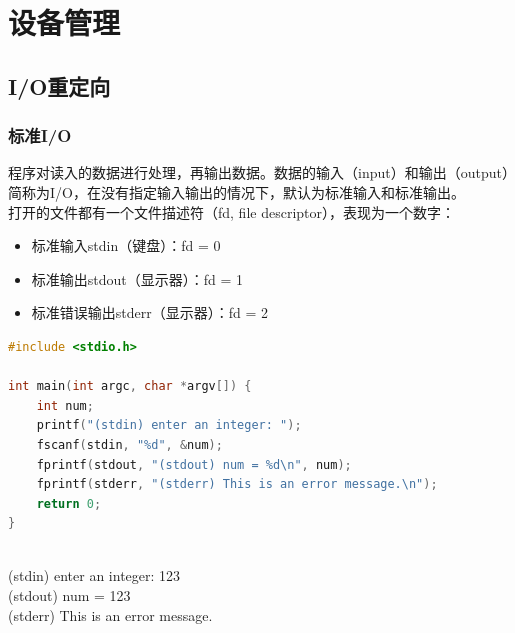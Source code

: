 \chapter{设备管理}

\section{I/O重定向}

\subsection{标准I/O}

程序对读入的数据进行处理，再输出数据。数据的输入（input）和输出（output）简称为I/O，在没有指定输入输出的情况下，默认为标准输入和标准输出。 \\

打开的文件都有一个文件描述符（fd, file descriptor），表现为一个数字：

\begin{itemize}
	\item 标准输入stdin（键盘）：fd = 0
	\item 标准输出stdout（显示器）：fd = 1
	\item 标准错误输出stderr（显示器）：fd = 2 \\
\end{itemize}

\begin{lstlisting}[language=C]
#include <stdio.h>

int main(int argc, char *argv[]) {
    int num;
    printf("(stdin) enter an integer: ");
    fscanf(stdin, "%d", &num);
    fprintf(stdout, "(stdout) num = %d\n", num);
    fprintf(stderr, "(stderr) This is an error message.\n");
    return 0;
}
\end{lstlisting}

\begin{tcolorbox}
	 \\
	(stdin) enter an integer: 123 \\
	(stdout) num = 123 \\
	(stderr) This is an error message.
\end{tcolorbox}

